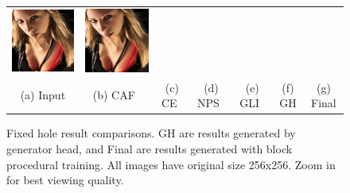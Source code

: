 \begin{figure}[h!]
\begin{tabular}{ccccccc}
\includegraphics[width=.14\textwidth]{figures/imagenet/imagenet_0197_g.jpg}&
\includegraphics[width=.14\textwidth]{figures/imagenet/imagenet_0197_synthesized_image.jpg}\\
(a) Input & (b) CAF~\cite{barnes2009patchmatch} & (c) CE~\cite{pathak2016context} & (d) NPS~\cite{yang2017high} & (e) GLI~\cite{iizuka2017globally} & (f) GH & (g) Final \\
\end{tabular}
\caption{Fixed hole result comparisons. GH are results generated by generator head, and Final are results generated with block procedural training. All images have original size 256x256. Zoom in for best viewing quality.}
\label{fig:fixed}
\vspace{-10pt}
\end{figure}

